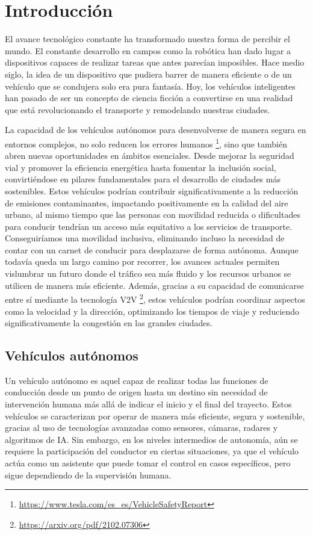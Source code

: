 \chapter{Introducción}
\label{cap:introduccion}
\setcounter{page}{1}

El avance tecnológico constante ha transformado nuestra forma de percibir el mundo. El constante desarrollo en campos como la robótica han dado lugar a dispositivos capaces de realizar tareas que antes parecían imposibles. Hace medio siglo, la idea de un dispositivo que pudiera barrer de manera eficiente o de un vehículo que se condujera solo era pura fantasía. Hoy, los vehículos inteligentes han pasado de ser un concepto de ciencia ficción a convertirse en una realidad que está revolucionando el transporte y remodelando nuestras ciudades.

La capacidad de los vehículos autónomos para desenvolverse de manera segura en entornos complejos, no solo reducen los errores humanos \footnote{\url{https://www.tesla.com/es_es/VehicleSafetyReport}}, sino que también abren nuevas oportunidades en ámbitos esenciales. Desde mejorar la seguridad vial y promover la eficiencia energética hasta fomentar la inclusión social, convirtiéndose en pilares fundamentales para el desarrollo de ciudades más sostenibles. Estos vehículos podrían contribuir significativamente a la reducción de emisiones contaminantes, impactando positivamente en la calidad del aire urbano, al mismo tiempo que las personas con movilidad reducida o dificultades para conducir tendrían un acceso más equitativo a los servicios de transporte. Conseguiríamos una movilidad inclusiva, eliminando incluso la necesidad de contar con un carnet de conducir para desplazarse de forma autónoma. Aunque todavía queda un largo camino por recorrer, los avances actuales permiten vislumbrar un futuro donde el tráfico sea más fluido y los recursos urbanos se utilicen de manera más eficiente. Además, gracias a su capacidad de comunicarse entre sí mediante la tecnología \ac{V2V} \footnote{\url{https://arxiv.org/pdf/2102.07306}}, estos vehículos podrían coordinar aspectos como la velocidad y la dirección, optimizando los tiempos de viaje y reduciendo significativamente la congestión en las grandes ciudades.

\section{Vehículos autónomos}
\label{sec:vehículos}

Un vehículo autónomo es aquel capaz de realizar todas las funciones de conducción desde un punto de origen hasta un destino sin necesidad de intervención humana más allá de indicar el inicio y el final del trayecto. Estos vehículos se caracterizan por operar de manera más eficiente, segura y sostenible, gracias al uso de tecnologías avanzadas como sensores, cámaras, radares y algoritmos de \ac{IA}. Sin embargo, en los niveles intermedios de autonomía, aún se requiere la participación del conductor en ciertas situaciones, ya que el vehículo actúa como un asistente que puede tomar el control en casos específicos, pero sigue dependiendo de la supervisión humana.

